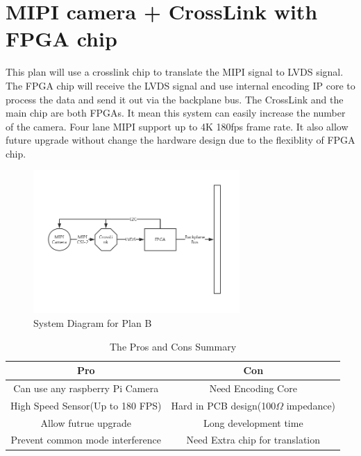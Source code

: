 \documentclass[12pt,article]{memoir}
\begin{document}
\section{MIPI camera + CrossLink with FPGA chip}
This plan will use a crosslink chip to translate the MIPI signal to LVDS signal. The FPGA chip will receive the LVDS signal and use internal encoding IP core to process the data and send it out via the backplane bus. The CrossLink and the main chip are both FPGAs. It mean this system can easily increase the number of the camera. Four lane MIPI support up to 4K 180fps frame rate. It also allow future upgrade without change the hardware design due to the flexiblity of FPGA chip.
\begin{figure}[htp]
\begin{center}
\includegraphics[width=0.7\textwidth]{DR00002_Plan2.png}
 \caption{System Diagram for Plan B}	
\end{center}
\end{figure}
\begin{table}[H]
	\centering
		\begin{tabu}{c | c }
		Pro & Con \\ \hline
		Can use any raspberry Pi Camera & Need Encoding Core \\
		High Speed Sensor(Up to 180 FPS) & Hard in PCB design(100$\Omega$ impedance) \\
		Allow futrue upgrade & Long development time \\
		Prevent common mode interference  & Need Extra chip for translation \\
		\end{tabu}
	\caption{The Pros and Cons Summary}
\end{table}
\newpage
\end{document}
